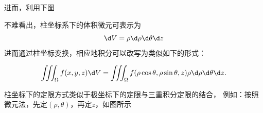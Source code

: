 进而，利用下图
\begin{center}
\end{center}
不难看出，柱坐标系下的体积微元可表示为
$$\d V=\rho \d\rho \d\theta \d z$$
进而通过柱坐标变换，相应地积分可以改写为类似如下的形式：
\begin{thx}
	$${\iiint_{\Omega}f(x,y,z)\d
	V=\iiint_{\Omega}f(\rho\cos\theta,\rho\sin\theta,z)\rho 
	\d\rho \d\theta \d z}.$$
\end{thx}
柱坐标下的定限方式类似于极坐标下的定限与三重积分定限的结合，
例如：按照微元法，先定$(\rho,\theta)$，再定$z$，如图所示
\begin{center}
\end{center}
